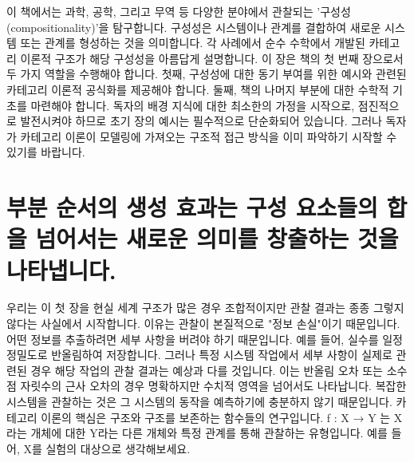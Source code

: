 \documentclass[11pt, a4paper, twoside, openany]{book}
\begin{document}
\tableofcontents
\clearpage


이 책에서는 과학, 공학, 그리고 무역 등 다양한 분야에서 관찰되는 '구성성(compositionality)'을 탐구합니다. 구성성은 시스템이나 관계를 결합하여 새로운 시스템 또는 관계를 형성하는 것을 의미합니다. 각 사례에서 순수 수학에서 개발된 카테고리 이론적 구조가 해당 구성성을 아름답게 설명합니다. 이 장은 책의 첫 번째 장으로서 두 가지 역할을 수행해야 합니다. 첫째, 구성성에 대한 동기 부여를 위한 예시와 관련된 카테고리 이론적 공식화를 제공해야 합니다. 둘째, 책의 나머지 부분에 대한 수학적 기초를 마련해야 합니다. 독자의 배경 지식에 대한 최소한의 가정을 시작으로, 점진적으로 발전시켜야 하므로 초기 장의 예시는 필수적으로 단순화되어 있습니다. 그러나 독자가 카테고리 이론이 모델링에 가져오는 구조적 접근 방식을 이미 파악하기 시작할 수 있기를 바랍니다.


\section{부분 순서의 생성 효과는 구성 요소들의 합을 넘어서는 새로운 의미를 창출하는 것을 나타냅니다.}
\par\medskip


우리는 이 첫 장을 현실 세계 구조가 많은 경우 조합적이지만 관찰 결과는 종종 그렇지 않다는 사실에서 시작합니다. 이유는 관찰이 본질적으로 "정보 손실"이기 때문입니다. 어떤 정보를 추출하려면 세부 사항을 버려야 하기 때문입니다. 예를 들어, 실수를 일정 정밀도로 반올림하여 저장합니다. 그러나 특정 시스템 작업에서 세부 사항이 실제로 관련된 경우 해당 작업의 관찰 결과는 예상과 다를 것입니다. 이는 반올림 오차 또는 소수점 자릿수의 근사 오차의 경우 명확하지만 수치적 영역을 넘어서도 나타납니다. 복잡한 시스템을 관찰하는 것은 그 시스템의 동작을 예측하기에 충분하지 않기 때문입니다. 카테고리 이론의 핵심은 구조와 구조를 보존하는 함수들의 연구입니다. f : X → Y 는 X라는 개체에 대한 Y라는 다른 개체와 특정 관계를 통해 관찰하는 유형입니다. 예를 들어, X를 실험의 대상으로 생각해보세요.
\end{document}
